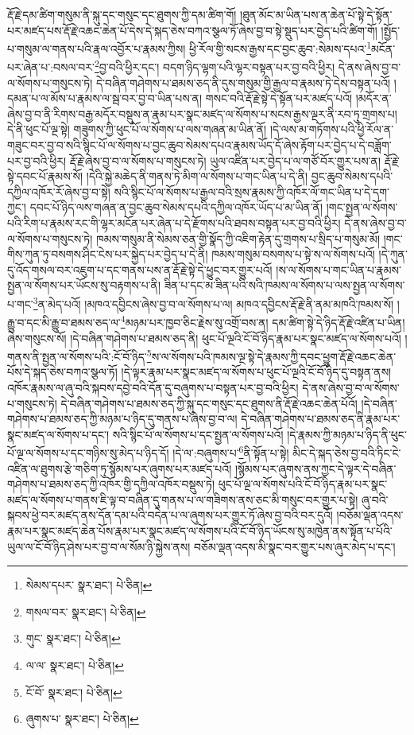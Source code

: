 རྡོ་རྗེ་དམ་ཚིག་གསུམ་ནི་སྐུ་དང་གསུང་དང་ཐུགས་ཀྱི་དམ་ཚིག་གོ། །ཐུན་མོང་མ་ཡིན་པས་ན་ཆེན་པོ་སྟེ་དེ་སྟོན་པར་མཛད་པས་རྡོ་རྗེ་འཆང་ཆེན་པོ་དེས་དེ་སྐད་ཅེས་བཀའ་སྩལ་ཏོ་ཞེས་བྱ་བ་སྟེ་སྡུད་པར་བྱེད་པའི་ཚིག་གོ། །སྤྱོད་པ་གསུམ་ལ་གནས་པའི་རྣལ་འབྱོར་པ་རྣམས་ཀྱིས། ཕྱི་རོལ་གྱི་སངས་རྒྱས་དང་བྱང་ཆུབ་:སེམས་དཔའ་\footnote{སེམས་དཔར་  སྣར་ཐང་།  པེ་ཅིན། }མངོན་པར་ཞེན་པ་:བསལ་བར་\footnote{གསལ་བར་  སྣར་ཐང་།  པེ་ཅིན། }བྱ་བའི་ཕྱིར་དང་། བདག་ཉིད་ལྷག་པའི་ལྷར་བསྟན་པར་བྱ་བའི་ཕྱིར། དེ་ནས་ཞེས་བྱ་བ་ལ་སོགས་པ་གསུངས་ཏེ། དེ་བཞིན་གཤེགས་པ་ཐམས་ཅད་ནི་དུས་གསུམ་གྱི་རྒྱལ་བ་རྣམས་ཏེ་དེས་བསྟན་པའོ། །དམན་པ་ལ་མོས་པ་རྣམས་ལ་སྦ་བར་བྱ་བ་ཡིན་པས་ན། གསང་བའི་རྡོ་རྗེ་སྟེ་དེ་སྟོན་པར་མཛད་པའོ། །མདོར་ན་ཞེས་བྱ་བ་ནི་རིགས་བརྒྱ་མདོར་བསྡུས་ན་རྣམ་པར་སྣང་མཛད་ལ་སོགས་པ་སངས་རྒྱས་ལྔར་ནི་རབ་ཏུ་གྲགས་པ། དེ་ནི་ཕུང་པོ་ལྔ་སྟེ། གཟུགས་ཀྱི་ཕུང་པོ་ལ་སོགས་པ་ལས་གཞན་མ་ཡིན་ནོ། །དེ་ལས་མ་གཏོགས་པའི་ཕྱི་རོལ་ན་གཟུང་བར་བྱ་བ་སའི་སྙིང་པོ་ལ་སོགས་པ་བྱང་ཆུབ་སེམས་དཔའ་རྣམས་ཡོད་དོ་ཞེས་རྟོག་པར་བྱེད་པ་དེ་བཟློག་པར་བྱ་བའི་ཕྱིར། རྡོ་རྗེ་ཞེས་བྱ་བ་ལ་སོགས་པ་གསུངས་ཏེ། ཡུལ་འཛིན་པར་བྱེད་པ་ལ་གཙོ་བོར་གྱུར་པས་ན། རྡོ་རྗེ་སྟེ་དབང་པོ་རྣམས་སོ། །དེའི་སྐྱེ་མཆེད་ནི་གནས་ཏེ་མིག་ལ་སོགས་པ་གང་ཡིན་པ་དེ་ནི། བྱང་ཆུབ་སེམས་དཔའི་དཀྱིལ་འཁོར་རོ་ཞེས་བྱ་བ་སྟེ། སའི་སྙིང་པོ་ལ་སོགས་པ་རྒྱལ་བའི་སྲས་རྣམས་ཀྱི་འཁོར་ལོ་གང་ཡིན་པ་དེ་དག་ཀྱང་། དབང་པོ་ཉིད་ལས་གཞན་ན་བྱང་ཆུབ་སེམས་དཔའི་དཀྱིལ་འཁོར་ཡོད་པ་མ་ཡིན་ནོ། །གང་སྤྱན་ལ་སོགས་པའི་རིག་པ་རྣམས་རང་གི་ལྷར་མངོན་པར་ཞེན་པ་དེ་རྫོགས་པའི་ཐབས་བསྟན་པར་བྱ་བའི་ཕྱིར། དེ་ནས་ཞེས་བྱ་བ་ལ་སོགས་པ་གསུངས་ཏེ། ཁམས་གསུམ་ནི་སེམས་ཅན་གྱི་སྣོད་ཀྱི་འཇིག་རྟེན་དུ་གྲགས་པ་སྲིད་པ་གསུམ་མོ། །གང་གིས་ཀུན་ཏུ་བསགས་ཤིང་ངེས་པར་སྐྱེད་པར་བྱེད་པ་དེ་ནི། ཁམས་གསུམ་བསགས་པ་སྟེ་ས་ལ་སོགས་པའོ། །དེ་ཀུན་དུ་འོད་གསལ་བར་འཇུག་པ་དང་གནས་པས་ན་རྡོ་རྗེ་སྟེ་དེ་ཕྱུང་བར་གྱུར་པའོ། །ས་ལ་སོགས་པ་གང་ཡིན་པ་རྣམས་སྤྱན་ལ་སོགས་པར་ཡོངས་སུ་བརྟགས་པ་ནི། ཟིན་པ་དང་མ་ཟིན་པའི་སའི་ཁམས་ལ་སོགས་པ་ལས་སྤྱན་ལ་སོགས་པ་གང་\footnote{གུང་  སྣར་ཐང་།  པེ་ཅིན། }ན་མེད་པའོ། །མཁའ་དབྱིངས་ཞེས་བྱ་བ་ལ་སོགས་པ་ལ། མཁའ་དབྱིངས་རྡོ་རྗེ་ནི་ནམ་མཁའི་ཁམས་སོ། །རྒྱུ་བ་དང་མི་རྒྱུ་བ་ཐམས་ཅད་ལ་\footnote{ལ་ལ་  སྣར་ཐང་།  པེ་ཅིན། }མཉམ་པར་ཁྱབ་ཅིང་རྗེས་སུ་འགྲོ་བས་ན། དམ་ཚིག་སྟེ་དེ་ཉིད་རྡོ་རྗེ་འཛིན་པ་ཡིན། ཞེས་གསུངས་སོ། །དེ་བཞིན་གཤེགས་པ་ཐམས་ཅད་ནི། ཕུང་པོ་ལྔའི་ངོ་བོ་ཉིད་རྣམ་པར་སྣང་མཛད་ལ་སོགས་པའོ། །གནས་ནི་སྤྱན་ལ་སོགས་པའི་:ངོ་བོ་ཉིད་\footnote{ངོ་བོ་  སྣར་ཐང་།  པེ་ཅིན། }ས་ལ་སོགས་པའི་ཁམས་ལྔ་སྟེ་དེ་རྣམས་ཀྱི་དབང་ཕྱུག་རྡོ་རྗེ་འཆང་ཆེན་པོས་དེ་སྐད་ཅེས་བཀའ་སྩལ་ཏོ། །དེ་ལྟར་རྣམ་པར་སྣང་མཛད་ལ་སོགས་པ་ཕུང་པོ་ལྔའི་ངོ་བོ་ཉིད་དུ་བསྟན་ནས། འཁོར་རྣམས་ལ་ཞུ་བའི་སྐབས་དབྱེ་བའི་དོན་དུ་བཞུགས་པ་བསྟན་པར་བྱ་བའི་ཕྱིར། དེ་ནས་ཞེས་བྱ་བ་ལ་སོགས་པ་གསུངས་ཏེ། དེ་བཞིན་གཤེགས་པ་ཐམས་ཅད་ཀྱི་སྐུ་དང་གསུང་དང་ཐུགས་ནི་རྡོ་རྗེ་འཆང་ཆེན་པོའོ། །དེ་བཞིན་གཤེགས་པ་ཐམས་ཅད་ཀྱི་མཉམ་པ་ཉིད་དུ་གནས་པ་ཞེས་བྱ་བ་ལ། དེ་བཞིན་གཤེགས་པ་ཐམས་ཅད་ནི་རྣམ་པར་སྣང་མཛད་ལ་སོགས་པ་དང་། སའི་སྙིང་པོ་ལ་སོགས་པ་དང་སྤྱན་ལ་སོགས་པའོ། །དེ་རྣམས་ཀྱི་མཉམ་པ་ཉིད་ནི་ཕུང་པོ་ལྔ་ལ་སོགས་པ་དང་གཉིས་སུ་མེད་པ་ཉིད་དོ། །དེ་ལ་:བཞུགས་པ་\footnote{ཞུགས་པ་  སྣར་ཐང་།  པེ་ཅིན། }ནི་སྟོན་པ་སྟེ། མིང་དེ་སྐད་ཅེས་བྱ་བའི་ཏིང་ངེ་འཛིན་ལ་ཐུགས་རྩེ་གཅིག་ཏུ་སྙོམས་པར་ཞུགས་པར་མཛད་པའོ། །སྙོམས་པར་ཞུགས་ནས་ཀྱང་དེ་ལྟར་དེ་བཞིན་གཤེགས་པ་ཐམས་ཅད་ཀྱི་འཁོར་གྱི་དཀྱིལ་འཁོར་བསྡུས་ཏེ། ཕུང་པོ་ལྔ་ལ་སོགས་པའི་ངོ་བོ་ཉིད་རྣམ་པར་སྣང་མཛད་ལ་སོགས་པ་གནས་ཇི་ལྟ་བ་བཞིན་དུ་གནས་པ་ལ་གཟིགས་ནས་ཅང་མི་གསུང་བར་གྱུར་པ་སྟེ། ཞུ་བའི་སྐབས་ཕྱེ་བར་མཛད་ནས་དོན་དམ་པའི་བདེན་པ་ལ་ཞུགས་པར་གྱུར་ཏོ་ཞེས་བྱ་བའི་བར་དུའོ། །བཅོམ་ལྡན་འདས་རྣམ་པར་སྣང་མཛད་ཆེན་པོས་རྣམ་པར་སྣང་མཛད་ལ་སོགས་པའི་ངོ་བོ་ཉིད་ཡོངས་སུ་མཁྱེན་ནས་སྟོན་པ་པོའི་ཡུལ་ལ་ངོ་བོ་ཉིད་ཤེས་པར་བྱ་བ་ལ་སོམ་ཉི་སྐྱེས་ནས། བཅོམ་ལྡན་འདས་མི་སྣང་བར་གྱུར་པས་ཞུར་མེད་པ་དང་། 